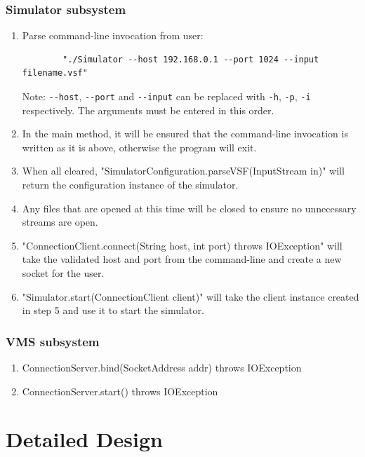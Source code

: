 \documentclass{article}
\begin{document}
\subsubsection{Simulator subsystem} %

\begin{enumerate}
  \item Parse command-line invocation from user: 
		\begin{verbatim}
		"./Simulator --host 192.168.0.1 --port 1024 --input filename.vsf"
		\end{verbatim}
		Note: \verb|--host|, \verb|--port| and \verb|--input| can be replaced with \verb|-h|, \verb|-p|, \verb|-i| respectively.
		\newline The arguments must be entered in this order.
  \item In the main method, it will be ensured that the command-line invocation is written as it is above, otherwise the program will exit.
  \item When all cleared, "SimulatorConfiguration.parseVSF(InputStream in)" will return the configuration instance of the simulator.
  \item Any files that are opened at this time will be closed to ensure no unnecessary streams are open.
	\item "ConnectionClient.connect(String host, int port) throws IOException" will take the validated host and port from the command-line and create a new socket for the user.
	\item "Simulator.start(ConnectionClient client)" will take the client instance created in step 5 and use it to start the simulator.	
\end{enumerate}

\subsubsection{VMS subsystem} %

\begin{enumerate}
  \item ConnectionServer.bind(SocketAddress addr) throws IOException
	\item ConnectionServer.start() throws IOException
\end{enumerate}

\break

\section{Detailed Design} %
\end{document}
